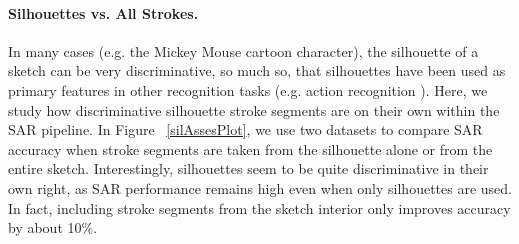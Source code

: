 \paragraph{Silhouettes vs. All Strokes.} In many cases (e.g. the Mickey Mouse cartoon character), the silhouette of a sketch can be very discriminative, so much so, that silhouettes have been used as primary features in other recognition tasks (e.g. action recognition \cite{li2008expandable}). Here, we study how discriminative silhouette stroke segments are on their own within the SAR pipeline. In Figure ~\ref{silAssesPlot}, we use two datasets to compare SAR accuracy when stroke segments are taken from the silhouette alone or from the entire sketch. Interestingly, silhouettes seem to be quite discriminative in their own right, as SAR performance remains high even when only silhouettes are used. In fact, including stroke segments from the sketch interior only improves accuracy by about 10\%.







